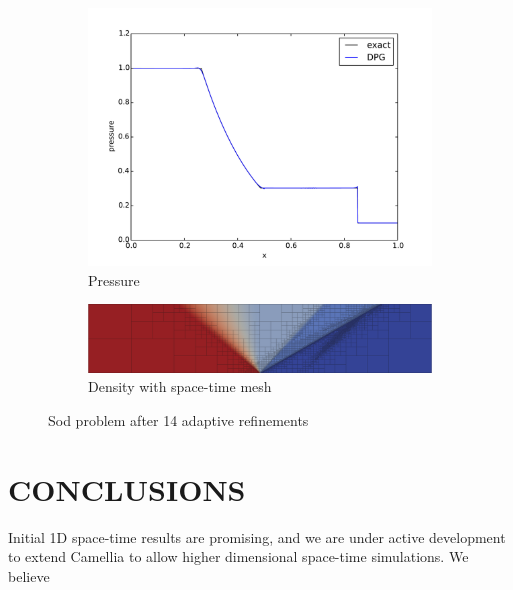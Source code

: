 \documentclass{parcfd2014}
\begin{document}
\begin{figure}[h]
\begin{subfigure}[c]{0.3\textwidth}
\includegraphics[width=\textwidth]{figs/Sod1e-5/pres15.pdf}
\caption{Pressure}
\label{fig:sod_pres14}
\end{subfigure}
\begin{subfigure}[c]{0.9\textwidth}
\centering
\includegraphics[width=\textwidth]{figs/Sod1e-5/mesh15.png}
\caption{Density with space-time mesh}
\label{fig:sod_mesh14}
\end{subfigure}
\caption{Sod problem after 14 adaptive refinements}
\label{fig:sod}
\end{figure}


\section{CONCLUSIONS}
Initial 1D space-time results are promising, and we are under active development to extend Camellia to allow higher dimensional space-time simulations.
We believe 





\end{document}

